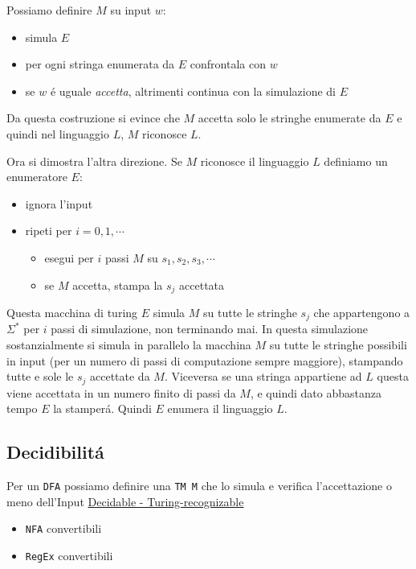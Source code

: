 \documentclass[
                        12pt, %
                        a4paper, %
                        oneside, %
                        headinclude,footinclude, %
                        BCOR5mm, %
                  ]{scrartcl}
\begin{document}
Possiamo definire \(M\) su input \(w\):
\begin{itemize}
\item simula \(E\)
\item per ogni stringa enumerata da \(E\) confrontala con \(w\)
\item se \(w\) é uguale \emph{accetta}, altrimenti continua con la simulazione di \(E\)
\end{itemize}

Da questa costruzione si evince che \(M\) accetta solo le stringhe enumerate da \(E\) e quindi nel linguaggio \(L\), \(M\) riconosce \(L\).

Ora si dimostra l'altra direzione. Se \(M\) riconosce il linguaggio \(L\) definiamo un enumeratore \(E\):
\begin{itemize}
\item ignora l'input
\item ripeti per \(i=0,1,\cdots\)
\begin{itemize}
\item esegui per \(i\) passi \(M\) su \(s_1,s_2,s_3,\cdots\)
\item se \(M\) accetta, stampa la \(s_j\) accettata
\end{itemize}
\end{itemize}

Questa macchina di turing \(E\) simula \(M\) su tutte le stringhe \(s_j\) che appartengono a \(\Sigma^*\) per \(i\) passi di simulazione, non terminando mai.
In questa simulazione sostanzialmente si simula in parallelo la macchina \(M\) su tutte le stringhe possibili in input (per un numero di passi di computazione sempre maggiore), stampando tutte e sole le \(s_j\) accettate da \(M\).
Viceversa se una stringa appartiene ad \(L\) questa viene accettata in un numero finito di passi da \(M\), e quindi dato abbastanza tempo \(E\) la stamperá. Quindi \(E\) enumera il linguaggio \(L\).

\subsection{Decidibilitá}
\label{sec:orga8ab610}
Per un \texttt{DFA} possiamo definire una \texttt{TM M} che lo simula e verifica l'accettazione o meno dell'Input
\href{../media/img/decidable-recognizable.jpg}{Decidable - Turing-recognizable}
\begin{itemize}
\item \texttt{NFA} convertibili
\item \texttt{RegEx} convertibili
\end{itemize}
\end{document}

